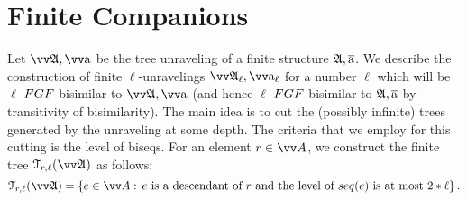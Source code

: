 
\section{Finite Companions}\label{sec:finite}
Let $\unravel{A}, \elemtuptuplea$ be the tree unraveling of a finite structure ${\mathfrak{A}}, \overline{\mathrm{a}}$.
We describe the construction of finite $\ell$-unravelings $\unravel{A}_{\ell}, \elemtuptuplea_{\ell}$ for a number $\ell$ which will be $\ell$-$\FGF$-bisimilar to $\unravel{A}, \elemtuptuplea$ (and hence $\ell$-$\FGF$-bisimilar to ${\mathfrak{A}}, \overline{\mathrm{a}}$ by transitivity of bisimilarity).
The main idea is to cut the (possibly infinite) trees generated by the unraveling at some depth.
The criteria that we employ for this cutting is the level of biseqs.
For an element $r \in \unraveldom{A}$, we construct the finite tree $\mathcal{T}_{r,\ell}(\unravel{A})$ as follows:
\begin{equation*}
  \mathcal{T}_{r,\ell}(\unravel{A}) = \left\{ e \in \unraveldom{A}:\, e\ \text{is a descendant of $r$ and the level of $\seq{e}$ is at most $2 * \ell$} \right\}.
\end{equation*}

